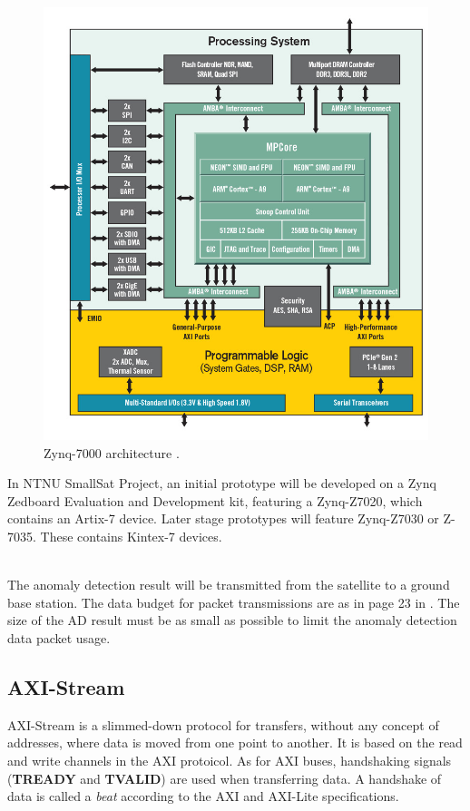 \begin{figure}[H]
\centering
   \includegraphics[scale=0.3]{images/zynq-mp-core-dual.png}
  \caption{ Zynq-7000 architecture \cite{cite:zynq_7000}. } 
  \label{fig:zynq_7000}
\end{figure}
 In NTNU SmallSat Project, an initial prototype will be developed on a Zynq Zedboard Evaluation and Development kit, featuring a Zynq-Z7020, which contains an Artix-7 device. Later stage prototypes will feature Zynq-Z7030 or Z-7035. These contains Kintex-7 devices. 

\\
The anomaly detection result will be transmitted from the satellite to a ground base station. The data budget for packet transmissions are as in page 23 in \cite{SmallSat_project_description}. The size of the AD result must be as small as possible to limit the anomaly detection data packet usage.  

\subsection{AXI-Stream}
AXI-Stream is a slimmed-down protocol for transfers, without any concept of addresses, where data is moved from one point to another. It is based on the read and write channels in the AXI protoicol. As for AXI buses, handshaking signals (\textbf{TREADY} and \textbf{TVALID}) are used when transferring data. A handshake of data is called a \textit{beat} according to the AXI and AXI-Lite specifications. \\

